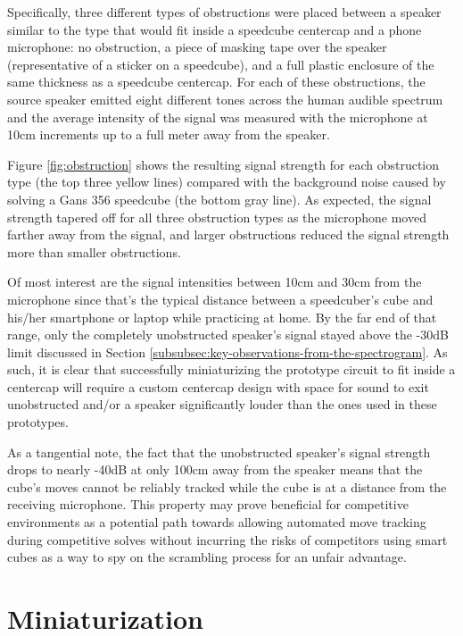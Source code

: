 Specifically, three different types of obstructions were placed between
a speaker similar to the type that would fit inside a speedcube
centercap and a phone microphone: no obstruction, a piece of masking
tape over the speaker (representative of a sticker on a speedcube), and
a full plastic enclosure of the same thickness as a speedcube
centercap. For each of these obstructions, the source speaker emitted
eight different tones across the human audible spectrum and the average
intensity of the signal was measured with the microphone at 10cm
increments up to a full meter away from the speaker.

Figure \ref{fig:obstruction} shows the resulting signal strength for
each obstruction type (the top three yellow lines) compared with the
background noise caused by solving a Gans 356 speedcube (the bottom
gray line). As expected, the signal strength tapered off for all three
obstruction types as the microphone moved farther away from the signal,
and larger obstructions reduced the signal strength more than smaller
obstructions.

Of most interest are the signal intensities between 10cm and 30cm from
the microphone since that's the typical distance between a speedcuber's
cube and his/her smartphone or laptop while practicing at home. By the
far end of that range, only the completely unobstructed speaker's
signal stayed above the -30dB limit discussed in Section
\ref{subsubsec:key-observations-from-the-spectrogram}. As such, it is
clear that successfully miniaturizing the prototype circuit to fit
inside a centercap will require a custom centercap design with space
for sound to exit unobstructed and/or a speaker significantly louder
than the ones used in these prototypes.

As a tangential note, the fact that the unobstructed speaker's signal
strength drops to nearly -40dB at only 100cm away from the speaker
means that the cube's moves cannot be reliably tracked while the cube
is at a distance from the receiving microphone. This property may prove
beneficial for competitive environments as a potential path towards
allowing automated move tracking during competitive solves without
incurring the risks of competitors using smart cubes as a way to spy on
the scrambling process for an unfair advantage.


\section{Miniaturization}
\label{sec:miniaturization}

